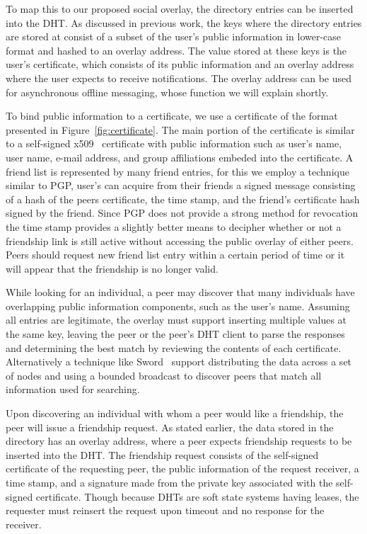 \documentclass[letterpaper,twocolumn,10pt]{article}
\begin{document}
To map this to our proposed social overlay, the directory entries can be
inserted into the DHT.  As discussed in previous work, the keys where the
directory entries are stored at consist of a subset of the user's public
information in lower-case format and hashed to an overlay  address.  The value
stored at these keys is the user's certificate, which consists of its public
information and an overlay address where the user expects to receive
notifications.  The overlay address can be used for asynchronous offline
messaging, whose function we will explain shortly.

To bind public information to a certificate, we use a certificate of the format
presented in Figure~\ref{fig:certificate}.  The main portion of the certificate is 
similar to a self-signed x509~\cite{x509} certificate with public information
such as user's name, user name, e-mail address, and group affiliations embeded
into the certificate.  A friend list is represented by many friend entries, for
this we employ a technique similar to PGP, user's can acquire from their friends
a signed message consisting of a hash of the peers certificate, the time stamp,
and the friend's certificate hash signed by the friend.  Since PGP does not
provide a strong method for revocation the time stamp provides a slightly better
means to decipher whether or not a friendship link is still active without
accessing the public overlay of either peers.  Peers should request new friend
list entry within a certain period of time or it will appear that the friendship
is no longer valid.

While looking for an individual, a peer may discover that many individuals have
overlapping public information components, such as the user's name.  Assuming
all entries are legitimate, the overlay must support inserting multiple values
at the same key, leaving the peer or the peer's DHT client to parse the
responses and determining the best match by reviewing the contents of each
certificate.  Alternatively a technique like Sword~\cite{sword} support
distributing the data across a set of nodes and using a bounded broadcast to
discover peers that match all information used for searching.

Upon discovering an individual with whom a peer would like a friendship, the
peer will issue a friendship request.  As stated earlier, the data stored in
the directory has an overlay address, where a peer expects friendship requests
to be inserted into the DHT.  The friendship request consists of the self-signed
certificate of the requesting peer, the public information of the request
receiver, a time stamp, and a signature made from the private key associated with
the self-signed certificate.  Though because DHTs are soft state systems having
leases, the requester must reinsert the request upon timeout and no response for
the receiver.
\end{document}

